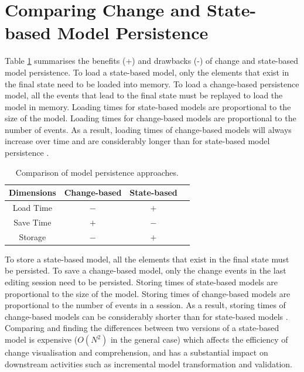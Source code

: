 \section{Comparing Change and State-based Model Persistence}
\label{sec:change_and_state_based_model_persistence}
Table \ref{table:persistence_comparsion} summarises the benefits (+) and drawbacks (-) of change and state-based model persistence. To load a state-based model, only the elements that exist in the final state need to be loaded into memory. To load a change-based persistence model, all the events that lead to the final state must be replayed to load the model in memory. Loading times for state-based models are proportional to the size of the model. Loading times for change-based models are proportional to the number of events. As a result, loading times of change-based models will always increase over time and are considerably longer than for state-based model persistence \cite{yohannis2018towards,mens2002state}. 

\begin{table}[ht]
  \caption{Comparison of model persistence approaches.}
  \label{table:persistence_comparsion}
  \centering
  \begin{small}
    \begin{tabular}{ c c c c }
      \hline 
      \textbf{Dimensions} & \textbf{Change-based} & \textbf{State-based} \\
      \hline 
      Load Time & $-$ & $+$ \\
      Save Time & $+$ & $-$ \\
      Storage & $-$ & $+$ \\
      \hline 
    \end{tabular}
  \end{small}
\end{table}

To store a state-based model, all the elements that exist in the final state must be persisted. To save a change-based model, only the change events in the last editing session need to be persisted. Storing times of state-based models are proportional to the size of the model. Storing times of change-based models are proportional to the number of events in a session. As a result, storing times of change-based models can be considerably shorter than for state-based models \cite{yohannis2018towards}. Comparing and finding the differences between two versions of a state-based model is expensive \cite{Kolovos:2009:DMM:1564596.1564641} ($O(N^2)$ in the general case) which affects the efficiency of change visualisation and comprehension, and has a substantial impact on downstream activities such as incremental model transformation \cite{DBLP:conf/ecmdafa/OgunyomiRK15} and validation.

